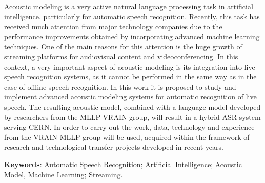\begin{ParrafoIngles}
Acoustic modeling is a very active natural language processing task in artificial intelligence, particularly for automatic speech recognition.
Recently, this task has received much attention from major technology companies due to the performance improvements obtained by incorporating advanced machine learning techniques.
One of the main reasons for this attention is the huge growth of streaming platforms for audiovisual content and videoconferencing. In this context, a very important aspect of acoustic modeling is its integration into live speech recognition systems, as it cannot be performed in the same way as in the case of offline speech recognition. In this work it is proposed to study and implement advanced acoustic modeling systems for automatic recognition of live speech. 
The resulting acoustic model, combined with a language model developed by researchers from the MLLP-VRAIN group, will result in a hybrid ASR system serving CERN.
In order to carry out the work, data, technology and experience from the VRAIN MLLP group will be used, acquired within the framework of research and technological transfer projects developed in recent years.

\textbf{Keywords}: Automatic Speech Recognition; Artificial Intelligence; Acoustic Model, Machine Learning; Streaming.

\end{ParrafoIngles}

